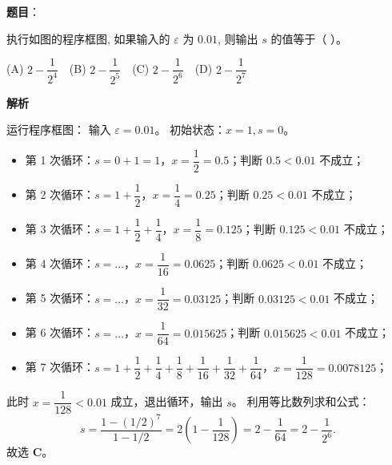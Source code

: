 \begin{answer}

\textbf{题目}：

执行如图的程序框图, 如果输入的 $\varepsilon$ 为 $0.01$, 则输出 $s$ 的值等于（ ）。
\nopagebreak[4]
\begin{center}\end{center}
\nopagebreak[4]
(A) $2 - \dfrac{1}{2^4}$　(B) $2 - \dfrac{1}{2^5}$　(C) $2 - \dfrac{1}{2^6}$　(D) $2 - \dfrac{1}{2^7}$

\textbf{解析}

运行程序框图：
输入 $\varepsilon = 0.01$。
初始状态：$x = 1, s = 0$。
\begin{itemize}
\item 第 1 次循环：$s = 0 + 1 = 1$，$x = \dfrac{1}{2} = 0.5$；判断 $0.5 < 0.01$ 不成立；
\item 第 2 次循环：$s = 1 + \dfrac{1}{2}$，$x = \dfrac{1}{4} = 0.25$；判断 $0.25 < 0.01$ 不成立；
\item 第 3 次循环：$s = 1 + \dfrac{1}{2} + \dfrac{1}{4}$，$x = \dfrac{1}{8} = 0.125$；判断 $0.125 < 0.01$ 不成立；
\item 第 4 次循环：$s = \dots$，$x = \dfrac{1}{16} = 0.0625$；判断 $0.0625 < 0.01$ 不成立；
\item 第 5 次循环：$s = \dots$，$x = \dfrac{1}{32} = 0.03125$；判断 $0.03125 < 0.01$ 不成立；
\item 第 6 次循环：$s = \dots$，$x = \dfrac{1}{64} = 0.015625$；判断 $0.015625 < 0.01$ 不成立；
\item 第 7 次循环：$s = 1 + \dfrac{1}{2} + \dfrac{1}{4} + \dfrac{1}{8} + \dfrac{1}{16} + \dfrac{1}{32} + \dfrac{1}{64}$，$x = \dfrac{1}{128} = 0.0078125$；
\end{itemize}
此时 $x = \dfrac{1}{128} < 0.01$ 成立，退出循环，输出 $s$。
利用等比数列求和公式：
\nopagebreak[4]
\[s = \frac{1 - (1/2)^7}{1 - 1/2} = 2\left(1 - \frac{1}{128}\right) = 2 - \frac{1}{64} = 2 - \frac{1}{2^6}.\]
故选 \textbf{C}。


\end{answer}
